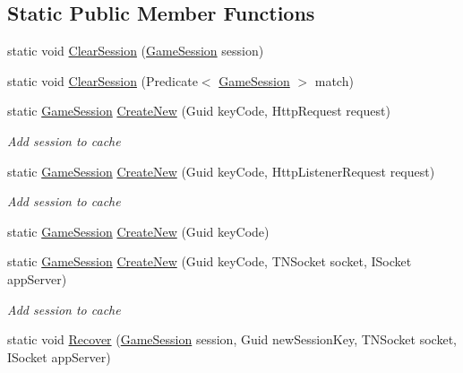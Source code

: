\subsection*{Static Public Member Functions}
\begin{DoxyCompactItemize}
\item 
static void \mbox{\hyperlink{class_t_net_1_1_contract_1_1_game_session_abdf2337f56bee6ba4e1924bb2e4d2d09}{Clear\+Session}} (\mbox{\hyperlink{class_t_net_1_1_contract_1_1_game_session}{Game\+Session}} session)
\item 
static void \mbox{\hyperlink{class_t_net_1_1_contract_1_1_game_session_a5990f377ea7a34e25d57fa244f99e581}{Clear\+Session}} (Predicate$<$ \mbox{\hyperlink{class_t_net_1_1_contract_1_1_game_session}{Game\+Session}} $>$ match)
\item 
static \mbox{\hyperlink{class_t_net_1_1_contract_1_1_game_session}{Game\+Session}} \mbox{\hyperlink{class_t_net_1_1_contract_1_1_game_session_a4c3a59a0d42f93edb6a7d74b51f13fa9}{Create\+New}} (Guid key\+Code, Http\+Request request)
\begin{DoxyCompactList}\small\item\em Add session to cache \end{DoxyCompactList}\item 
static \mbox{\hyperlink{class_t_net_1_1_contract_1_1_game_session}{Game\+Session}} \mbox{\hyperlink{class_t_net_1_1_contract_1_1_game_session_aa13f6734b52da1108bc677898f09f2ca}{Create\+New}} (Guid key\+Code, Http\+Listener\+Request request)
\begin{DoxyCompactList}\small\item\em Add session to cache \end{DoxyCompactList}\item 
static \mbox{\hyperlink{class_t_net_1_1_contract_1_1_game_session}{Game\+Session}} \mbox{\hyperlink{class_t_net_1_1_contract_1_1_game_session_a6142a8d48d3693d3dfb7f43d6cddb8e9}{Create\+New}} (Guid key\+Code)
\item 
static \mbox{\hyperlink{class_t_net_1_1_contract_1_1_game_session}{Game\+Session}} \mbox{\hyperlink{class_t_net_1_1_contract_1_1_game_session_a9dd16391327609b53ff9e154919e9aba}{Create\+New}} (Guid key\+Code, T\+N\+Socket socket, I\+Socket app\+Server)
\begin{DoxyCompactList}\small\item\em Add session to cache \end{DoxyCompactList}\item 
static void \mbox{\hyperlink{class_t_net_1_1_contract_1_1_game_session_a0c8928b8df7f3eb09c61107d1ce5efe6}{Recover}} (\mbox{\hyperlink{class_t_net_1_1_contract_1_1_game_session}{Game\+Session}} session, Guid new\+Session\+Key, T\+N\+Socket socket, I\+Socket app\+Server)

\end{DoxyCompactItemize}
